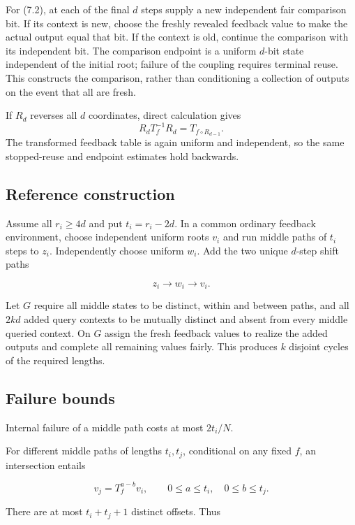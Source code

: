 \documentclass[11pt]{article}
\theoremstyle{remark}
\begin{document}
For (7.2), at each of the final \(d\) steps supply a new independent
fair comparison bit. If its context is new, choose the freshly revealed
feedback value to make the actual output equal that bit. If the context
is old, continue the comparison with its independent bit. The comparison
endpoint is a uniform \(d\)-bit state independent of the initial root;
failure of the coupling requires terminal reuse. This constructs the
comparison, rather than conditioning a collection of outputs on the
event that all are fresh.

If \(R_d\) reverses all \(d\) coordinates, direct calculation gives \[
 R_dT_f^{-1}R_d=T_{f\circ R_{d-1}}.
\] The transformed feedback table is again uniform and independent, so
the same stopped-reuse and endpoint estimates hold backwards.

\subsection{Reference construction}\label{reference-construction}

Assume all \(r_i\ge4d\) and put \(t_i=r_i-2d\). In a common ordinary
feedback environment, choose independent uniform roots \(v_i\) and run
middle paths of \(t_i\) steps to \(z_i\). Independently choose uniform
\(w_i\). Add the two unique \(d\)-step shift paths

\[
 z_i\longrightarrow w_i\longrightarrow v_i.
\]

Let \(G\) require all middle states to be distinct, within and between
paths, and all \(2kd\) added query contexts to be mutually distinct and
absent from every middle queried context. On \(G\) assign the fresh
feedback values to realize the added outputs and complete all remaining
values fairly. This produces \(k\) disjoint cycles of the required
lengths.

\subsection{Failure bounds}\label{failure-bounds}

Internal failure of a middle path costs at most \(2t_i/N\).

For different middle paths of lengths \(t_i,t_j\), conditional on any
fixed \(f\), an intersection entails

\[
 v_j=T_f^{a-b}v_i,
 \qquad 0\le a\le t_i,\quad0\le b\le t_j.
\]

There are at most \(t_i+t_j+1\) distinct offsets. Thus
\end{document}
